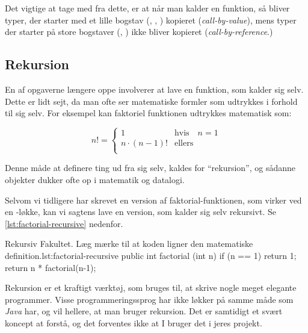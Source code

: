         Det vigtige at tage med fra dette, er at når man kalder en
        funktion, så bliver typer, der starter med et lille bogstav
        (, , ) kopieret
        (\emph{call-by-value}), mens typer der starter på store
        bogstaver (, ) ikke bliver kopieret
        (\emph{call-by-reference}.)

	\subsection{Rekursion}

        En af opgaverne længere  oppe
        involverer at lave en funktion, som kalder sig selv. Dette er
        lidt sejt, da man ofte ser matematiske formler som udtrykkes i
        forhold til sig selv. For eksempel kan faktoriel funktionen
        udtrykkes matematisk som:

        \begin{equation}
            n! = \begin{cases}
                       1 & \text{hvis} \quad n = 1 \\
                       n\cdot(n-1)! & \text{ellers} \\
                  \end{cases}
        \end{equation}

        Denne måde at definere ting ud fra sig selv, kaldes for
        ``rekursion'', og sådanne objekter dukker ofte op i matematik
        og datalogi.


        Selvom vi tidligere har skrevet en version af
        faktorial-funktionen, som virker ved en -løkke,
        kan vi sagtens lave en version, som kalder sig selv rekursivt.
        Se \autoref{lst:factorial-recursive} nedenfor.

        \begin{JavaCode}{Rekursiv Fakultet. Læg mærke til at koden ligner den matematiske definition.}{lst:factorial-recursive}
            public int factorial (int n) {
                if (n == 1) return 1;
                return n * factorial(n-1);
            }
        \end{JavaCode}

        Rekursion er et kraftigt værktøj, som bruges til, at skrive
        nogle meget elegante programmer. Visse programmeringssprog har
        ikke løkker på samme måde som \emph{Java} har, og vil hellere,
        at man bruger rekursion.  Det er samtidigt et svært koncept at
        forstå, og det forventes ikke at I bruger det i jeres projekt.

